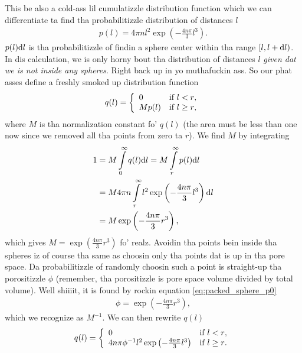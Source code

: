 This be also a cold-ass lil cumulatizzle distribution function which we can differentiate ta find tha probabilitizzle distribution of distances $l$
\begin{align}
	\label{eq:packed_sphere_probability_number_density}
	p(l) = 4\pi n l^2 \exp\left(-\frac{4n\pi}{3}l^3\right).
\end{align}
$p(l)\mathrm{d}l$ is tha probabilitizzle of findin a sphere center within tha range $[l, l+\mathrm{d}l)$. In dis calculation, we is only horny bout tha distribution of distances $l$ \textit{given dat we is not inside any spheres}. Right back up in yo muthafuckin ass. So our phat asses define a freshly smoked up distribution function
\begin{align}
	q(l) = \left\{\begin{array}{l l}
			0 & \text{if $l<r$},\\
			Mp(l) & \text{if $l\geq r$},
			\end{array}\right.
\end{align}
where $M$ is tha normalization constant fo' $q(l)$ (the area must be less than one now since we removed all tha points from zero ta $r$). We find $M$ by integrating
\begin{align}
	1 &= M\int\limits_0^\infty q(l)\mathrm{d}l = M\int\limits_r^\infty p(l)\mathrm{d}l\\
	&= M4\pi n\int\limits_r^\infty l^2 \exp\left(-\frac{4n\pi}{3}l^3\right) \mathrm{d}l\\
	&= M\exp\left(-\frac{4n\pi}{3}r^3\right),
\end{align}
which gives $M=\exp\left(\frac{4n\pi}{3}r^3\right)$ fo' realz. Avoidin tha points bein inside tha spheres iz of course tha same as choosin only tha points dat is up in tha pore space. Da probabilitizzle of randomly choosin such a point is straight-up tha porositizzle $\phi$ (remember, tha porositizzle is pore space volume divided by total volume). Well shiiiit, it is found by rockin equation \eqref{eq:packed_sphere_p0}
\begin{align}
	\label{eq:packed_sphere_porosity}
	\phi = \exp\left(-\frac{4n\pi}{3}r^3\right),
\end{align}
which we recognize as $M^{-1}$. We can then rewrite $q(l)$
\begin{align}
	q(l) = \left\{\begin{array}{l l}
			0 & \text{if $l<r$},\\
			4n\pi\phi^{-1} l^2 \exp\left(-\frac{4n\pi}{3}l^3\right) & \text{if $l\geq r$}.
			\end{array}\right.
\end{align}
